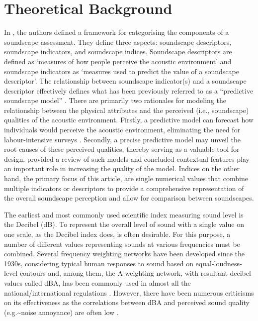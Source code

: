 \documentclass[
  authoryear,
  preprint,
  1p]{elsarticle}
\begin{document}
\section{Theoretical Background}\label{sec-theoretical-background}

In \citet{Aletta2016Soundscape}, the authors defined a framework for
categorising the components of a soundscape assessment. They define
three aspects: soundscape descriptors, soundscape indicators, and
soundscape indices. Soundscape descriptors are defined as `measures of
how people perceive the acoustic environment' and soundscape indicators
as `measures used to predict the value of a soundscape descriptor'. The
relationship between soundscape indicator(s) and a soundscape descriptor
effectively defines what has been previously referred to as a
``predictive soundscape model''
\citep{Aletta2016Soundscape, Mitchell2022Predictive}. There are
primarily two rationales for modeling the relationship between the
physical attributes and the perceived (i.e., soundscape) qualities of
the acoustic environment. Firstly, a predictive model can forecast how
individuals would perceive the acoustic environment, eliminating the
need for labour-intensive surveys \citep{Mitchell2023conceptual}.
Secondly, a precise predictive model may unveil the root causes of these
perceived qualities, thereby serving as a valuable tool for design.
\citet{Lionello2020systematic} provided a review of such models and
concluded contextual features play an important role in increasing the
quality of the model. Indices on the other hand, the primary focus of
this article, are single numerical values that combine multiple
indicators or descriptors to provide a comprehensive representation of
the overall soundscape perception and allow for comparison between
soundscapes.

The earliest and most commonly used scientific index measuring sound
level is the Decibel (dB). To represent the overall level of sound with
a single value on one scale, as the Decibel index does, is often
desirable. For this purpose, a number of different values representing
sounds at various frequencies must be combined. Several frequency
weighting networks have been developed since the 1930s, considering
typical human responses to sound based on equal-loudness-level contours
\citep{Fletcher1933Loudness} and, among them, the A-weighting network,
with resultant decibel values called dBA, has been commonly used in
almost all the national/international regulations
\citep{Kryter1994Handbook}. However, there have been numerous criticisms
on its effectiveness \citep{Parmanen2007weighted} as the correlations
between dBA and perceived sound quality (e.g.\textasciitilde noise
annoyance) are often low \citep{Hellman1987Why}.
\end{document}
